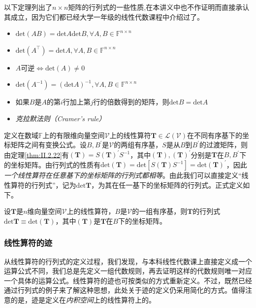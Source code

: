 \documentclass[../main.tex]{subfiles}
\begin{document}
以下定理列出了$n\times n$矩阵的行列式的一些性质,在本讲义中也不作证明而直接承认其成立，因为它们都已经大学一年级的线性代数课程中介绍过了。

\begin{theorem}\label{thm:II.2.24}
    \quad
    \begin{itemize}
        \item $\mathrm{det}\left(AB\right)=\mathrm{det}A\mathrm{det}B,\forall A,B\in\mathbb{F}^{n\times n}$
        \item $\mathrm{det}\left(A^\intercal\right)=\mathrm{det}A,\forall A,B\in\mathbb{F}^{n\times n}$
        \item ${A}$可逆$\Leftrightarrow\mathrm{det}\left(A\right)\neq 0$
        \item $\mathrm{det}\left(A^{-1}\right)=\left(\mathrm{det}A\right)^{-1},\forall A,B\in\mathbb{F}^{n\times n}$
        \item 如果$B$是$A$的第$i$行加上第$j$行的倍数得到的矩阵，则$\mathrm{det}B=\mathrm{det}A$

        \item \emph{克拉默法则（Cramer's rule）}\cite[\S1.5]{周胜林2012线性代数}
    \end{itemize}
\end{theorem}

定义在数域$\mathbb{F}$上的有限维向量空间$\mathcal{V}$上的线性算符$\mathbf{T}\in\mathcal{L}\left(\mathcal{V}\right)$在不同有序基下的坐标矩阵之间有变换公式。设$B,B^\prime$是$\mathcal{V}$的两组有序基，$S$是从$B$到$B^\prime$的过渡矩阵，则由定理\ref{thm:II.2.22}有$\left(\mathbf{T}\right)=S\left(\mathbf{T}\right)^\prime S^{-1}$，其中$\left(\mathbf{T}\right),\left(\mathbf{T}\right)^\prime$分别是$\mathbf{T}$在$B,B^\prime$下的坐标矩阵。由行列式的性质有$\mathrm{det}\left(\mathbf{T}\right)=\mathrm{det}\left[S\left(\mathbf{T}\right)S^{-1}\right]=\mathrm{det}\left(\mathbf{T}\right)^\prime$，因此\emph{一个线性算符在任意基下的坐标矩阵的行列式都相等}。由此我们可以直接定义“线性算符的行列式”，记为$\mathrm{det}\mathbf{T}$，为其在任一基下的坐标矩阵的行列式。正式定义如下。

\begin{definition}[线性算符的行列式]\label{def:II.2.18}
    设$\mathbf{T}$是$n$维向量空间$\mathcal{V}$上的线性算符，$B$是$\mathcal{V}$的一组有序基，则$\mathbf{T}$的行列式$\mathrm{det}\mathbf{T}\equiv\mathrm{det}\left(\mathbf{T}\right)$，其中$\left(\mathbf{T}\right)$是$\mathbf{T}$在$B$下的坐标矩阵。
\end{definition}
\subsubsection{线性算符的迹}
从线性算符的行列式的定义过程，我们发现，与本科线性代数课上直接定义成一个运算公式不同，我们总是先定义一组代数规则，再去证明这样的代数规则唯一对应一个具体的运算公式。线性算符的迹也可按类似的方式重新定义。不过，既然已经通过行列式的例子来了解这种思想，此处关于迹的定义仍采用简化的方式。值得注意的是，迹是定义在\emph{内积空间}上的线性算符上的。
\end{document}
